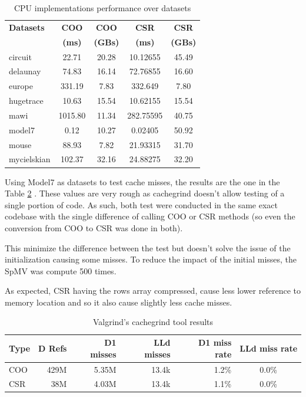 \documentclass[conference]{IEEEtran}
\begin{document}
\begin{table}[h!]
	\centering
	\begin{adjustbox}{width=0.9\columnwidth}
		\begin{tabular}{lcccc}
			\toprule
			\textbf{Datasets} & \textbf{COO} & \textbf{COO} & \textbf{CSR} & \textbf{CSR} \\
			& \textbf{(ms)} & \textbf{(GBs)} & \textbf{(ms)} & \textbf{(GBs)} \\
			\midrule
			circuit & 22.71 & 20.28 & 10.12655 & 45.49 \\
			delaunay & 74.83 & 16.14 & 72.76855 & 16.60 \\
			europe & 331.19 & 7.83 & 332.649 & 7.80 \\
			hugetrace & 10.63 & 15.54 & 10.62155 & 15.54 \\
			mawi & 1015.80 & 11.34 & 282.75595 & 40.75 \\
			model7 & 0.12 & 10.27 & 0.02405 & 50.92 \\
			mouse & 88.93 & 7.82 & 21.93315 & 31.70 \\
			mycielskian & 102.37 & 32.16 & 24.88275 & 32.20 \\
		\end{tabular}
	\end{adjustbox}
	\vspace{1em}

	\caption{CPU implementations performance over datasets}
	\label{tab:time-cpu-results}
\end{table}


Using Model7 as datasets to test cache misses, the results are the one in the Table \ref{tab:cache-results} . These values are very rough as cachegrind doesn't allow testing of a single portion of code. As such, both test were conducted in the same exact codebase with the single difference of calling COO or CSR methods (so even the conversion from COO to CSR was done in both).

This minimize the difference between the test but doesn't solve the issue of the initialization causing some misses. To reduce the impact of the initial misses, the SpMV was compute 500 times.

As expected, CSR having the rows array compressed, cause less lower reference to memory location and so it also cause slightly less cache misses.
\begin{table}[h!]
	\centering
	\begin{adjustbox}{width=\columnwidth}
		\begin{tabular}{lrrrrc}
			\toprule
			\textbf{Type} & \textbf{D Refs} & \textbf{D1 misses} & \textbf{LLd misses} & \textbf{D1 miss rate} & \textbf{LLd miss rate} \\
			\midrule
			COO & 429M & 5.35M & 13.4k & 1.2\% & 0.0\% \\
			CSR & 38M & 4.03M & 13.4k & 1.1\% & 0.0\% \\
			\bottomrule
		\end{tabular}
	\end{adjustbox}
	\vspace{1em}

	\caption{Valgrind's cachegrind tool results}
	\label{tab:cache-results}
\end{table}
\end{document}
